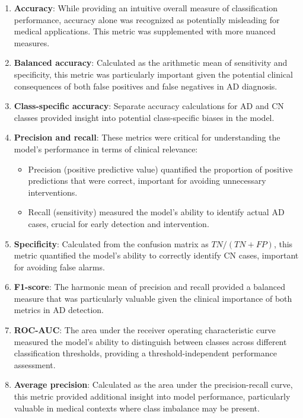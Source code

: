 \documentclass[12pt, a4paper]{article}
\begin{document}
\begin{enumerate}
    \item \textbf{Accuracy}: While providing an intuitive overall measure of classification performance, accuracy alone was recognized as potentially misleading for medical applications. This metric was supplemented with more nuanced measures.
    
    \item \textbf{Balanced accuracy}: Calculated as the arithmetic mean of sensitivity and specificity, this metric was particularly important given the potential clinical consequences of both false positives and false negatives in AD diagnosis.
    
    \item \textbf{Class-specific accuracy}: Separate accuracy calculations for AD and CN classes provided insight into potential class-specific biases in the model.
    
    \item \textbf{Precision and recall}: These metrics were critical for understanding the model's performance in terms of clinical relevance:
    \begin{itemize}
        \item Precision (positive predictive value) quantified the proportion of positive predictions that were correct, important for avoiding unnecessary interventions.
        \item Recall (sensitivity) measured the model's ability to identify actual AD cases, crucial for early detection and intervention.
    \end{itemize}
    
    \item \textbf{Specificity}: Calculated from the confusion matrix as $TN/(TN+FP)$, this metric quantified the model's ability to correctly identify CN cases, important for avoiding false alarms.
    
    \item \textbf{F1-score}: The harmonic mean of precision and recall provided a balanced measure that was particularly valuable given the clinical importance of both metrics in AD detection.
    
    \item \textbf{ROC-AUC}: The area under the receiver operating characteristic curve measured the model's ability to distinguish between classes across different classification thresholds, providing a threshold-independent performance assessment.
    
    \item \textbf{Average precision}: Calculated as the area under the precision-recall curve, this metric provided additional insight into model performance, particularly valuable in medical contexts where class imbalance may be present.
\end{enumerate}
\end{document}
